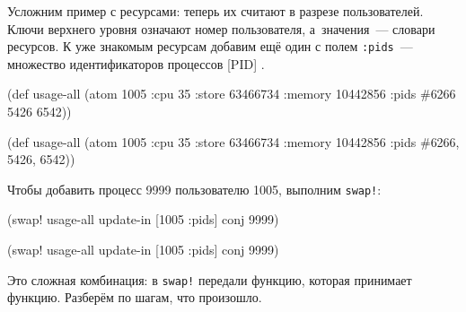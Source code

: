 
Усложним пример с ресурсами: теперь их считают в разрезе пользователей. Ключи
верхнего уровня означают номер пользователя, а~значения~--- словари ресурсов. К
уже знакомым ресурсам добавим ещё один с полем \verb|:pids|~--- множество
идентификаторов процессов [PID]
.

\ifnarrow

\begin{english}
  \begin{clojure/lines}
(def usage-all
  (atom {1005 {:cpu 35
               :store 63466734
               :memory 10442856
               :pids #{6266
                       5426
                       6542}}}))
  \end{clojure/lines}
\end{english}

\else

\begin{english}
  \begin{clojure/lines}
(def usage-all
  (atom {1005 {:cpu 35
               :store 63466734
               :memory 10442856
               :pids #{6266, 5426, 6542}}}))
  \end{clojure/lines}
\end{english}
\fi

Чтобы добавить процесс 9999 пользователю 1005, выполним \verb|swap!|:

\ifnarrow

\begin{english}
  \begin{clojure}
(swap! usage-all
  update-in [1005 :pids] conj 9999)
  \end{clojure}
\end{english}

\else

\begin{english}
  \begin{clojure}
(swap! usage-all update-in [1005 :pids] conj 9999)
  \end{clojure}
\end{english}

\fi

Это сложная комбинация: в \verb|swap!| передали функцию, которая принимает
функцию. Разберём по шагам, что произошло.

